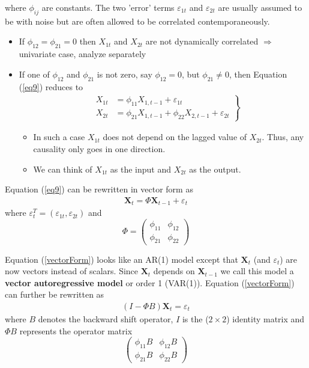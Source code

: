 where $\phi_{ij}$ are constants. The two 'error' terms $\varepsilon_{1t}$ and $\varepsilon_{2t}$ are usually assumed to be with noise but are often allowed to be correlated contemporaneously. 
\begin{itemize}
    \item If $\phi_{12}=\phi_{21}=0$ then $X_{1t}$ and $X_{2t}$ are not dynamically correlated $\Rightarrow$ univariate case, analyze separately
    \item If one of $\phi_{12}$ and $\phi_{21}$ is not zero, say $\phi_{12}=0$, but $\phi_{21}\neq 0$, then Equation (\ref{eq9}) reduces to
    \begin{equation}
\begin{split}
& \left.
\begin{aligned}
    X_{1t} &= \phi_{11} X_{1,t-1} + \varepsilon_{1t} \\
    X_{2t} &= \phi_{21} X_{1,t-1} + \phi_{22} X_{2,t-1} + \varepsilon_{2t}
\end{aligned}
\right\}
\end{split}
\end{equation}
        \begin{itemize}
            \item In such a case $X_{1t}$ does not depend on the lagged value of $X_{2t}$. Thus, any causality only goes in one direction.
            \item We can think of $X_{1t}$ as the input and $X_{2t}$ as the output. 
        \end{itemize}
\end{itemize}

\noindent
Equation (\ref{eq9}) can be rewritten in vector form as 
\begin{align}
    \mathbf{X}_t=\Phi \mathbf{X}_{t-1}+ \varepsilon_t \label{vectorForm}
\end{align}
where $\varepsilon_t^T=(\varepsilon_{1t},\varepsilon_{2t})$ and \[\Phi=\begin{pmatrix}
    \phi_{11} & \phi_{12}\\
    \phi_{21} & \phi_{22}
\end{pmatrix}\]

\noindent
Equation (\ref{vectorForm}) looks like an AR(1) model except that $\mathbf{X}_t$ (and $\varepsilon_t$) are now vectors instead of scalars. Since $\mathbf{X}_t$ depends on $\mathbf{X}_{t-1}$ we call this model a \textbf{vector autoregressive model} or order 1 (VAR(1)). Equation (\ref{vectorForm}) can further be rewritten as 
\begin{align}
    (I-\Phi B)\mathbf{X}_t =\varepsilon_t \label{13.13}
\end{align}
where $B$ denotes the backward shift operator, $I$ is the ($2\times 2$) identity matrix and $\Phi B$ represents the operator matrix \[\begin{pmatrix}
    \phi_{11}B & \phi_{12}B \\
    \phi_{21}B & \phi_{22}B
\end{pmatrix}\]

